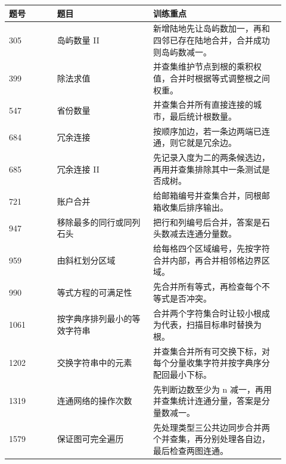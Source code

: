 
\begin{longtable}{@{}p{0.16\linewidth}p{0.32\linewidth}p{0.44\linewidth}@{}}
\toprule
题号 & 题目 & 训练重点\\
\midrule
\endhead
305 & 岛屿数量 II & 新增陆地先让岛屿数加一，再和四邻已存在陆地合并，合并成功则岛屿数减一。\\
399 & 除法求值 & 并查集维护节点到根的乘积权值，合并时根据等式调整根之间权重。\\
547 & 省份数量 & 并查集合并所有直接连接的城市，最后统计根数量。\\
684 & 冗余连接 & 按顺序加边，若一条边两端已连通，则它就是冗余边。\\
685 & 冗余连接 II & 先记录入度为二的两条候选边，再用并查集排除其中一条测试是否成树。\\
721 & 账户合并 & 给邮箱编号并查集合并，同根邮箱收集后排序输出。\\
947 & 移除最多的同行或同列石头 & 把行和列编号后合并，答案是石头数减去连通分量数。\\
959 & 由斜杠划分区域 & 给每格四个区域编号，先按字符合并内部，再合并相邻格边界区域。\\
990 & 等式方程的可满足性 & 先合并所有等式，再检查每个不等式是否冲突。\\
1061 & 按字典序排列最小的等效字符串 & 合并两个字符集合时让较小根成为代表，扫描目标串时替换为根。\\
1202 & 交换字符串中的元素 & 并查集合并所有可交换下标，对每个分量收集字符并按字典序分配回最小下标。\\
1319 & 连通网络的操作次数 & 先判断边数至少为 n 减一，再用并查集统计连通分量，答案是分量数减一。\\
1579 & 保证图可完全遍历 & 先处理类型三公共边同步合并两个并查集，再分别处理各自边，最后检查两图连通。\\
\bottomrule
\end{longtable}


